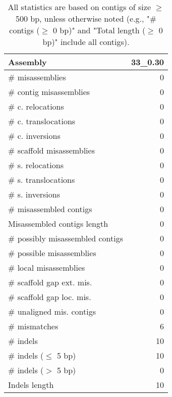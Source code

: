 \documentclass[12pt,a4paper]{article}
\begin{document}
\begin{table}[ht]
\begin{center}
\caption{All statistics are based on contigs of size $\geq$ 500 bp, unless otherwise noted (e.g., "\# contigs ($\geq$ 0 bp)" and "Total length ($\geq$ 0 bp)" include all contigs).}
\begin{tabular}{|l*{1}{|r}|}
\hline
Assembly & 33\_0.30 \\ \hline
\# misassemblies & 0 \\ \hline
\hspace{2mm}\# contig misassemblies & 0 \\ \hline
\hspace{5mm}\# c. relocations & 0 \\ \hline
\hspace{5mm}\# c. translocations & 0 \\ \hline
\hspace{5mm}\# c. inversions & 0 \\ \hline
\hspace{2mm}\# scaffold misassemblies & 0 \\ \hline
\hspace{5mm}\# s. relocations & 0 \\ \hline
\hspace{5mm}\# s. translocations & 0 \\ \hline
\hspace{5mm}\# s. inversions & 0 \\ \hline
\# misassembled contigs & 0 \\ \hline
Misassembled contigs length & 0 \\ \hline
\# possibly misassembled contigs & 0 \\ \hline
\hspace{5mm}\# possible misassemblies & 0 \\ \hline
\# local misassemblies & 0 \\ \hline
\# scaffold gap ext. mis. & 0 \\ \hline
\# scaffold gap loc. mis. & 0 \\ \hline
\# unaligned mis. contigs & 0 \\ \hline
\# mismatches & 6 \\ \hline
\# indels & 10 \\ \hline
\hspace{5mm}\# indels ($\leq$ 5 bp) & 10 \\ \hline
\hspace{5mm}\# indels ($>$ 5 bp) & 0 \\ \hline
Indels length & 10 \\ \hline
\end{tabular}
\end{center}
\end{table}
\end{document}
